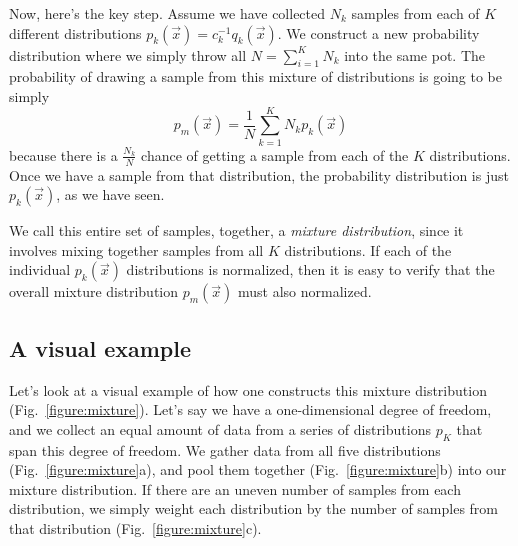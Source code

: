 \documentclass[aps,pre,twocolumn,superscriptaddress]{revtex4-1}
\begin{document}
Now, here's the key step.  Assume we have collected $N_k$ samples from
each of $K$ different distributions $p_k(\vec{x}) = c_k^{-1}
q_k(\vec{x})$. We construct a new probability distribution where we
simply throw all $N = \sum_{i=1}^K N_k$ into the same pot. The
probability of drawing a sample from this mixture of distributions is
going to be simply
\begin{equation}
p_m(\vec{x}) = \frac{1}{N}\sum_{k=1}^K N_k p_k(\vec{x})
\end{equation}
because there is a $\frac{N_k}{N}$ chance of getting a sample from
each of the $K$ distributions. Once we have a sample from that
distribution, the probability distribution is just $p_k(\vec{x})$, as
we have seen.

We call this entire set of samples, together, a {\em mixture
  distribution}, since it involves mixing together samples from all
$K$ distributions.  If each of the individual $p_k(\vec{x})$
distributions is normalized, then it is easy to verify that the
overall mixture distribution $p_m(\vec{x})$ must also normalized.

\subsection*{A visual example}

Let's look at a visual example of how one constructs this mixture
distribution (Fig.~\ref{figure:mixture}).  Let's say we have a
one-dimensional degree of freedom, and we collect an equal amount of
data from a series of distributions $p_K$ that span this degree of
freedom.  We gather data from all five distributions
(Fig.~\ref{figure:mixture}a), and pool them together
(Fig.~\ref{figure:mixture}b) into our mixture distribution. If there
are an uneven number of samples from each distribution, we simply
weight each distribution by the number of samples from that
distribution (Fig.~\ref{figure:mixture}c).
\end{document}
